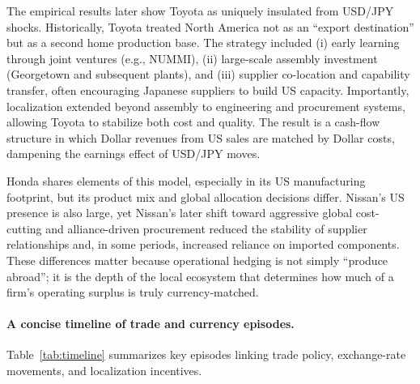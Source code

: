 \documentclass[12pt,a4paper]{article}
\begin{document}
The empirical results later show Toyota as uniquely insulated from USD/JPY shocks. Historically, Toyota treated North America not as an ``export destination'' but as a second home production base. The strategy included (i) early learning through joint ventures (e.g., NUMMI), (ii) large-scale assembly investment (Georgetown and subsequent plants), and (iii) supplier co-location and capability transfer, often encouraging Japanese suppliers to build US capacity. Importantly, localization extended beyond assembly to engineering and procurement systems, allowing Toyota to stabilize both cost and quality. The result is a cash-flow structure in which Dollar revenues from US sales are matched by Dollar costs, dampening the earnings effect of USD/JPY moves.

Honda shares elements of this model, especially in its US manufacturing footprint, but its product mix and global allocation decisions differ. Nissan's US presence is also large, yet Nissan's later shift toward aggressive global cost-cutting and alliance-driven procurement reduced the stability of supplier relationships and, in some periods, increased reliance on imported components. These differences matter because operational hedging is not simply ``produce abroad''; it is the depth of the local ecosystem that determines how much of a firm's operating surplus is truly currency-matched.

\paragraph{A concise timeline of trade and currency episodes.}

Table~\ref{tab:timeline} summarizes key episodes linking trade policy, exchange-rate movements, and localization incentives.
\end{document}
